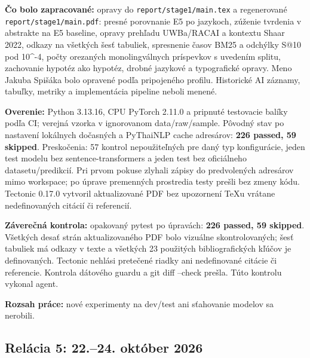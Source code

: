 \par\noindent \textbf{Čo bolo zapracované:} opravy do \texttt{report/\allowbreak{}stage1/\allowbreak{}main.\allowbreak{}tex} a regenerované \texttt{report/\allowbreak{}stage1/\allowbreak{}main.\allowbreak{}pdf}: presné porovnanie E5 po jazykoch, zúženie tvrdenia v abstrakte na E5 baseline, opravy prehľadu UWBa/RACAI a kontextu Shaar 2022, odkazy na všetkých šesť tabuliek, spresnenie časov BM25 a odchýlky S@10 pod 10\textasciicircum{}-4, počty orezaných monolingválnych príspevkov s uvedením splitu, zachovanie hypotéz ako hypotéz, drobné jazykové a typografické opravy. Meno Jakuba Spišáka bolo opravené podľa pripojeného profilu. Historické AI záznamy, tabuľky, metriky a implementácia pipeline neboli menené.\par\smallskip
\par\noindent \textbf{Overenie:} Python 3.13.16, CPU PyTorch 2.11.0 a pripnuté testovacie balíky podľa CI; verejná vzorka v ignorovanom data/raw/sample. Pôvodný stav po nastavení lokálnych dočasných a PyThaiNLP cache adresárov: \textbf{226 passed, 59 skipped}. Preskočenia: 57 kontrol nepoužiteľných pre daný typ konfigurácie, jeden test modelu bez sentence-transformers a jeden test bez oficiálneho datasetu/predikcií. Pri prvom pokuse zlyhali zápisy do predvolených adresárov mimo workspace; po úprave premenných prostredia testy prešli bez zmeny kódu. Tectonic 0.17.0 vytvoril aktualizované PDF bez upozornení TeXu vrátane nedefinovaných citácií či referencií.\par\smallskip
\par\noindent \textbf{Záverečná kontrola:} opakovaný pytest po úpravách: \textbf{226 passed, 59 skipped}. Všetkých desať strán aktualizovaného PDF bolo vizuálne skontrolovaných; šesť tabuliek má odkazy v texte a všetkých 23 použitých bibliografických kľúčov je definovaných. Tectonic nehlási pretečené riadky ani nedefinované citácie či referencie. Kontrola dátového guardu a git diff --check prešla. Túto kontrolu vykonal agent.\par\smallskip
\par\noindent \textbf{Rozsah práce:} nové experimenty na dev/test ani sťahovanie modelov sa nerobili.\par\smallskip

\subsection*{Relácia 5: 22.--24. október 2026}

